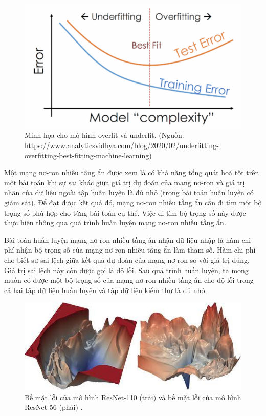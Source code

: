 \begin{figure}[htp]
	\centering
	\includegraphics[width=100 mm]{images/under-over.png}
	\caption{Minh họa cho mô hình overfit và underfit. (Nguồn: \url{https://www.analyticsvidhya.com/blog/2020/02/underfitting-overfitting-best-fitting-machine-learning})}
	\label{fig:under-over}
\end{figure}

Một mạng nơ-ron nhiều tầng ẩn được xem là có khả năng tổng quát hoá tốt trên một bài toán khi sự sai khác giữa giá trị dự đoán của mạng nơ-ron và giá trị nhãn của dữ liệu ngoài tập huấn luyện là đủ nhỏ (trong bài toán huấn luyện có giám sát). Để đạt được kết quả đó, mạng nơ-ron nhiều tầng ẩn cần đi tìm một bộ trọng số phù hợp cho từng bài toán cụ thể. Việc đi tìm bộ trọng số này được thực hiện thông qua quá trình huấn luyện mạng nơ-ron nhiều tầng ẩn.

Bài toán huấn luyện mạng nơ-ron nhiều tầng ẩn nhận dữ liệu nhập là hàm chi phí nhận bộ trọng số của mạng nơ-ron nhiều tầng ẩn làm tham số. Hàm chi phí cho biết sự sai lệch giữa kết quả dự đoán của mạng nơ-ron so với giá trị đúng. Giá trị sai lệch này còn được gọi là độ lỗi. Sau quá trình huấn luyện, ta mong muốn có được một bộ trọng số của mạng nơ-ron nhiều tầng ẩn cho độ lỗi trong cả hai tập dữ liệu huấn luyện và tập dữ liệu kiểm thử là đủ nhỏ.

\begin{figure}[htp]
	\centering
	\includegraphics[width=120 mm]{images/resnet-loss.png}
	\caption{Bề mặt lỗi của mô hình ResNet-110 (trái) và bề mặt lỗi của mô hình ResNet-56 (phải) \cite{li2018visualizing}.}
	\label{fig:resnet-loss}
\end{figure}

